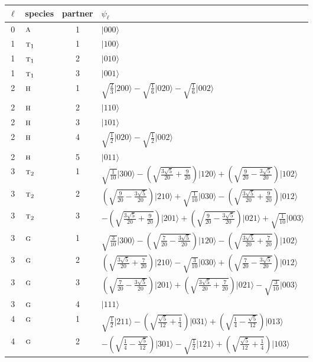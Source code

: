 \documentclass[11pt]{article}
\newcommand{\irr}[1]{\text{\normalfont\scshape #1}}
\newcommand{\occ}[1]{\lvert #1\rangle}
\begin{document}
\begin{longtable}{c l c p{}}\hline $\ell$ & species & partner & $\psi_\ell$\\ \hline\endhead
0 & $\irr{a}$ & 1 & $\occ{000}$\\
\hline
1 & $\irr{t}_{1}$ & 1 & $\occ{100}$\\
1 & $\irr{t}_{1}$ & 2 & $\occ{010}$\\
1 & $\irr{t}_{1}$ & 3 & $\occ{001}$\\
\hline
2 & $\irr{h}$ & 1 & $\sqrt{\tfrac{2}{3}}\occ{200}-\sqrt{\tfrac{1}{6}}\occ{020}-\sqrt{\tfrac{1}{6}}\occ{002}$\\
2 & $\irr{h}$ & 2 & $\occ{110}$\\
2 & $\irr{h}$ & 3 & $\occ{101}$\\
2 & $\irr{h}$ & 4 & $\sqrt{\tfrac{1}{2}}\occ{020}-\sqrt{\tfrac{1}{2}}\occ{002}$\\
2 & $\irr{h}$ & 5 & $\occ{011}$\\
\hline
3 & $\irr{t}_{2}$ & 1 & $\sqrt{\tfrac{1}{10}}\occ{300}-(\sqrt{\frac{3 \sqrt{5}}{20} + \frac{9}{20}})\occ{120}+(\sqrt{\frac{9}{20} - \frac{3 \sqrt{5}}{20}})\occ{102}$\\
3 & $\irr{t}_{2}$ & 2 & $(\sqrt{\frac{9}{20} - \frac{3 \sqrt{5}}{20}})\occ{210}+\sqrt{\tfrac{1}{10}}\occ{030}-(\sqrt{\frac{3 \sqrt{5}}{20} + \frac{9}{20}})\occ{012}$\\
3 & $\irr{t}_{2}$ & 3 & $-(\sqrt{\frac{3 \sqrt{5}}{20} + \frac{9}{20}})\occ{201}+(\sqrt{\frac{9}{20} - \frac{3 \sqrt{5}}{20}})\occ{021}+\sqrt{\tfrac{1}{10}}\occ{003}$\\
3 & $\irr{g}$ & 1 & $\sqrt{\tfrac{3}{10}}\occ{300}-(\sqrt{\frac{7}{20} - \frac{3 \sqrt{5}}{20}})\occ{120}-(\sqrt{\frac{3 \sqrt{5}}{20} + \frac{7}{20}})\occ{102}$\\
3 & $\irr{g}$ & 2 & $(\sqrt{\frac{3 \sqrt{5}}{20} + \frac{7}{20}})\occ{210}-\sqrt{\tfrac{3}{10}}\occ{030}+(\sqrt{\frac{7}{20} - \frac{3 \sqrt{5}}{20}})\occ{012}$\\
3 & $\irr{g}$ & 3 & $(\sqrt{\frac{7}{20} - \frac{3 \sqrt{5}}{20}})\occ{201}+(\sqrt{\frac{3 \sqrt{5}}{20} + \frac{7}{20}})\occ{021}-\sqrt{\tfrac{3}{10}}\occ{003}$\\
3 & $\irr{g}$ & 4 & $\occ{111}$\\
\hline
4 & $\irr{g}$ & 1 & $\sqrt{\tfrac{1}{2}}\occ{211}-(\sqrt{\frac{\sqrt{5}}{12} + \frac{1}{4}})\occ{031}+(\sqrt{\frac{1}{4} - \frac{\sqrt{5}}{12}})\occ{013}$\\
4 & $\irr{g}$ & 2 & $-(\sqrt{\frac{1}{4} - \frac{\sqrt{5}}{12}})\occ{301}-\sqrt{\tfrac{1}{2}}\occ{121}+(\sqrt{\frac{\sqrt{5}}{12} + \frac{1}{4}})\occ{103}$\\

\end{longtable}
\end{document}
